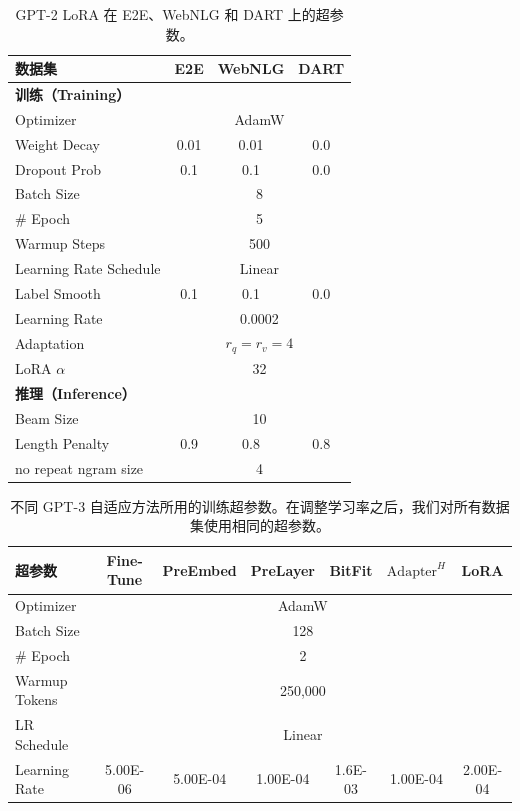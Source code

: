 \documentclass[11pt,UTF8,fontset=fandol]{ctexart}
\begin{document}
\begin{table}[H]\centering
\caption{GPT-2 LoRA 在 E2E、WebNLG 和 DART 上的超参数。}
\label{tab:11}
\begin{tabular}{lccc}
\toprule
数据集 & E2E & WebNLG & DART \\
\midrule
\multicolumn{4}{l}{\textbf{训练（Training）}} \\
Optimizer & \multicolumn{3}{c}{AdamW} \\
Weight Decay & 0.01 & 0.01 & 0.0 \\
Dropout Prob & 0.1 & 0.1 & 0.0 \\
Batch Size & \multicolumn{3}{c}{8} \\
\# Epoch & \multicolumn{3}{c}{5} \\
Warmup Steps & \multicolumn{3}{c}{500} \\
Learning Rate Schedule & \multicolumn{3}{c}{Linear} \\
Label Smooth & 0.1 & 0.1 & 0.0 \\
Learning Rate & \multicolumn{3}{c}{0.0002} \\
Adaptation & \multicolumn{3}{c}{$r_q=r_v=4$} \\
LoRA $\alpha$ & \multicolumn{3}{c}{32} \\
\multicolumn{4}{l}{\textbf{推理（Inference）}} \\
Beam Size & \multicolumn{3}{c}{10} \\
Length Penalty & 0.9 & 0.8 & 0.8 \\
no repeat ngram size & \multicolumn{3}{c}{4} \\
\bottomrule
\end{tabular}
\end{table}

\begin{table}[H]\centering
\caption{不同 GPT-3 自适应方法所用的训练超参数。在调整学习率之后，我们对所有数据集使用相同的超参数。}
\label{tab:12}
\begin{tabular}{lcccccc}
\toprule
超参数 & Fine-Tune & PreEmbed & PreLayer & BitFit & $\text{Adapter}^H$ & LoRA \\
\midrule
Optimizer & \multicolumn{6}{c}{AdamW} \\
Batch Size & \multicolumn{6}{c}{128} \\
\# Epoch & \multicolumn{6}{c}{2} \\
Warmup Tokens & \multicolumn{6}{c}{250{,}000} \\
LR Schedule & \multicolumn{6}{c}{Linear} \\
Learning Rate & 5.00E-06 & 5.00E-04 & 1.00E-04 & 1.6E-03 & 1.00E-04 & 2.00E-04 \\
\bottomrule
\end{tabular}
\end{table}
\end{document}
